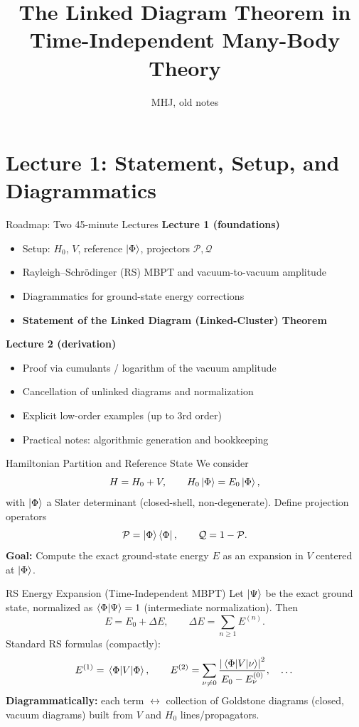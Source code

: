 \documentclass[aspectratio=169,11pt]{beamer}
\title{\Large The Linked Diagram Theorem in Time-Independent Many-Body Theory}
\author{MHJ, old notes}
\date{}
\newcommand{\Hn}{H_0}
\newcommand{\V}{V}
\newcommand{\Pcal}{\mathcal{P}}
\newcommand{\Qcal}{\mathcal{Q}}
\newcommand{\ketPhi}{\ket{\Phi}}                      %
\newcommand{\braPhi}{\bra{\Phi}}
\newcommand{\Egs}{E}
\begin{document}
\begin{frame}
  \titlepage
\end{frame}

\section*{Lecture 1: Statement, Setup, and Diagrammatics}

\begin{frame}{Roadmap: Two 45-minute Lectures}
\textbf{Lecture 1 (foundations)}\vspace{0.3em}
\begin{itemize}
  \item Setup: $\Hn$, $\V$, reference $\ketPhi$, projectors $\Pcal,\Qcal$
  \item Rayleigh--Schr\"odinger (RS) MBPT and vacuum-to-vacuum amplitude
  \item Diagrammatics for ground-state energy corrections
  \item \textbf{Statement of the Linked Diagram (Linked-Cluster) Theorem}
\end{itemize}
\textbf{Lecture 2 (derivation)}\vspace{0.3em}
\begin{itemize}
  \item Proof via cumulants / logarithm of the vacuum amplitude
  \item Cancellation of unlinked diagrams and normalization
  \item Explicit low-order examples (up to 3rd order)
  \item Practical notes: algorithmic generation and bookkeeping
\end{itemize}
\end{frame}

\begin{frame}{Hamiltonian Partition and Reference State}
We consider
\[
H=\Hn+\V,\qquad \Hn\ket{\Phi}=E_0\ket{\Phi},
\]
with $\ket{\Phi}$ a Slater determinant (closed-shell, non-degenerate). Define projection operators
\[
\Pcal=\ketPhi\braPhi,\qquad \Qcal=1-\Pcal.
\]
\smallskip
\textbf{Goal:} Compute the exact ground-state energy $\Egs$ as an expansion in $\V$ centered at $\ketPhi$.
\end{frame}

\begin{frame}{RS Energy Expansion (Time-Independent MBPT)}
Let $\ket{\Psi}$ be the exact ground state, normalized as $\braket{\Phi}{\Psi}=1$ (intermediate normalization). Then
\[
\Egs = E_0 + \Delta E, \qquad \Delta E = \sum_{n\ge 1} E^{(n)}.
\]
Standard RS formulas (compactly):
\[
E^{(1)}=\matrixel{\Phi}{\V}{\Phi},\qquad
E^{(2)}=\sum_{\nu\neq 0}\frac{\abs{\matrixel{\Phi}{\V}{\nu}}^2}{E_0-E_\nu^{(0)}},\quad \dots
\]
\textbf{Diagrammatically:} each term $\leftrightarrow$ collection of Goldstone diagrams (closed, vacuum diagrams) built from $\V$ and $\Hn$ lines/propagators.
\end{frame}
\end{document}
